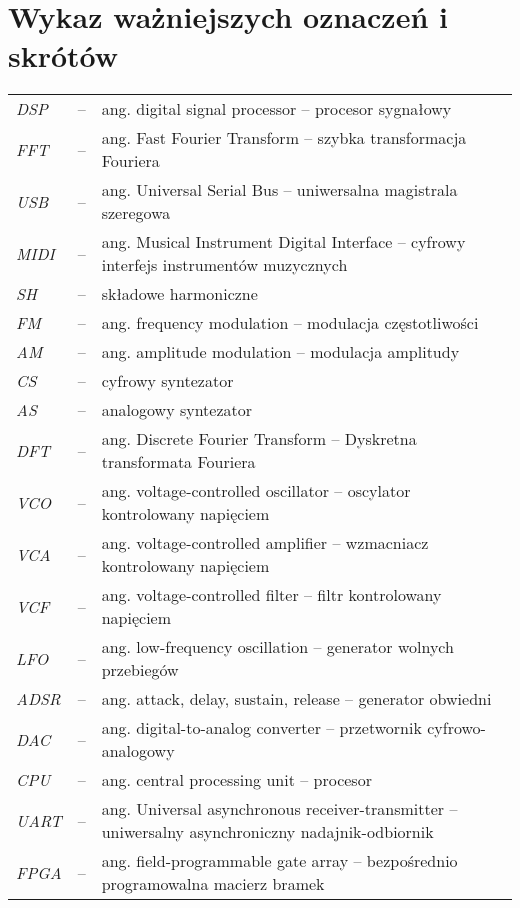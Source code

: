\chapter*{Wykaz ważniejszych oznaczeń i skrótów}

\begin{tabular}{lcl}
	\textit{DSP} & -- & ang. digital signal processor -- procesor sygnałowy \\
	\textit{FFT} & -- & ang. Fast Fourier Transform -- szybka transformacja Fouriera \\
	\textit{USB} & -- & ang. Universal Serial Bus -- uniwersalna magistrala szeregowa \\
	\textit{MIDI} & -- & ang. Musical Instrument Digital Interface -- cyfrowy interfejs instrumentów muzycznych \\
  \textit{SH} & -- & składowe harmoniczne \\
	\textit{FM} & -- & ang. frequency modulation -- modulacja częstotliwości \\
	\textit{AM} & -- & ang. amplitude modulation -- modulacja amplitudy \\
	\textit{CS} & -- & cyfrowy syntezator \\
	\textit{AS} & -- & analogowy syntezator \\
	\textit{DFT} & -- & ang. Discrete Fourier Transform -- Dyskretna transformata Fouriera \\
	\textit{VCO} & -- & ang. voltage-controlled oscillator -- oscylator kontrolowany napięciem \\
	\textit{VCA} & -- & ang. voltage-controlled amplifier -- wzmacniacz kontrolowany napięciem \\
	\textit{VCF} & -- & ang. voltage-controlled filter -- filtr kontrolowany napięciem \\
	\textit{LFO} & -- & ang. low-frequency oscillation -- generator wolnych przebiegów \\
	\textit{ADSR} & -- & ang. attack, delay, sustain, release -- generator obwiedni \\
	\textit{DAC} & -- & ang. digital-to-analog converter -- przetwornik cyfrowo-analogowy \\
	\textit{CPU} & -- & ang. central processing unit -- procesor \\
	\textit{UART} & -- & ang. Universal asynchronous receiver-transmitter -- uniwersalny asynchroniczny nadajnik-odbiornik \\
	\textit{FPGA} & -- & ang. field-programmable gate array -- bezpośrednio programowalna macierz bramek \\

\end{tabular}
